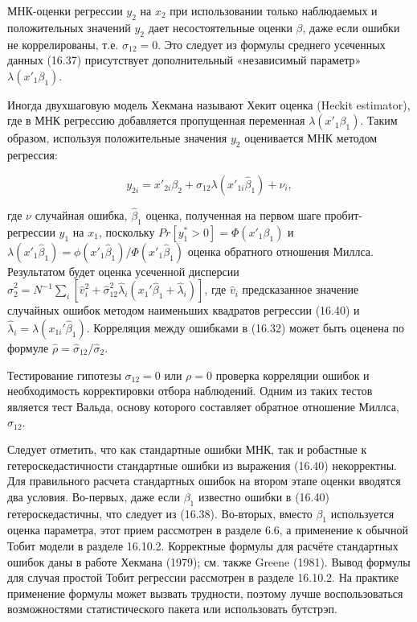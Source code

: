 МНК-оценки регрессии $y_2$ на $x_2$ при использовании только наблюдаемых и положительных значений $y_2$ дает несостоятельные оценки $\beta$, даже если ошибки не коррелированы, т.е. $\sigma_{12}=0$. Это следует из формулы среднего усеченных данных (16.37) присутствует дополнительный «независимый параметр» $\lambda(x'_1\beta_1)$. 

Иногда двухшаговую модель Хекмана называют Хекит оценка (Heckit estimator), где в МНК регрессию добавляется пропущенная переменная $\lambda(x'_1\beta_1)$. Таким образом, используя положительные значения $y_2$ оценивается МНК методом регрессия:

\begin{equation}
y_{2i}={x'}_{2i}\beta_2+\sigma_{12}\lambda({x'}_{1i}\hat{\beta}_1)+\nu_i,
\end{equation}

где $\nu$ случайная ошибка, $\hat{\beta}_1$ оценка, полученная на первом шаге пробит- регрессии $y_1$ на $x_1$, поскольку $Pr[y^{*}_1>0]=\Phi({x'}_1\beta_1)$ и $\lambda({x'}_1\hat{\beta}_1)=\phi({x'}_1\hat{\beta}_1)/{\Phi}({x'}_1\hat{\beta}_1)$ оценка обратного отношения Миллса. Результатом будет оценка усеченной дисперсии $\hat{\sigma}_2^2=N^{-1}\sum_i[\hat{v}_i^2+\hat{\sigma}_{12}^2\hat{\lambda}_i(x_1'\hat{\beta}_1+\hat{\lambda}_i)]$, где $\hat{v}_i$ предсказанное значение случайных ошибок методом наименьших квадратов регрессии (16.40) и $\hat{\lambda}_i=\lambda(x_{1i}'\hat{\beta}_1)$. Корреляция между ошибками в (16.32) может быть оценена по формуле $\hat{\rho}=\hat{\sigma}_{12}/\hat{\sigma}_2.$

Тестирование гипотезы $\sigma_{12}=0$ или $\rho=0$ проверка корреляции ошибок и необходимость корректировки отбора наблюдений. Одним из таких тестов является тест Вальда, основу которого составляет обратное отношение Миллса, $\hat{\sigma}_{12}$. 

Следует отметить, что как стандартные ошибки МНК, так и робастные к гетероскедастичности стандартные ошибки из выражения (16.40) некорректны. Для правильного расчета стандартных ошибок на втором этапе оценки вводятся два условия. Во-первых, даже если $\beta_1$ известно ошибки в (16.40) гетероскедастичны, что следует из (16.38). Во-вторых, вместо $\beta_1$ используется оценка параметра, этот прием рассмотрен в разделе 6.6, а применение к обычной Тобит модели в разделе 16.10.2. Корректные формулы для расчёте стандартных ошибок даны в работе Хекмана (1979); см. также Greene (1981). Вывод формулы для случая простой Тобит регрессии рассмотрен в разделе 16.10.2. На практике применение формулы может вызвать трудности, поэтому лучше воспользоваться возможностями статистического пакета или использовать бутстрэп.

